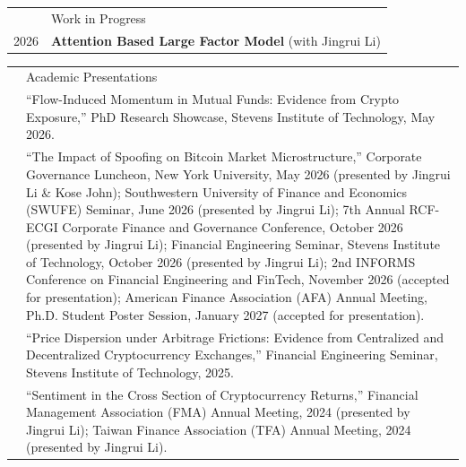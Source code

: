 \documentclass[letterpaper, 11pt]{article}
\newcommand{\headingfont}{\Large\color{OliveGreen}}
\newenvironment{SectionTable}[1]{
	\renewcommand*{\arraystretch}{1.55}
	\setlength{\tabcolsep}{10pt}
	\begin{longtable}{Rp{5.45in}} & #1 \\}
{\end{longtable}\vspace{-.3cm}}
\newenvironment{SectionTableSingleSpace}[1]{
	\renewcommand*{\arraystretch}{1.15}
	\setlength{\tabcolsep}{10pt}
	\begin{longtable}{Rp{5.45in}} & #1 \\[0.6em]}
{\end{longtable}\vspace{-.3cm}}
\begin{document}
\begin{SectionTable}{\headingfont Work in Progress}
2026 &
\textbf{Attention Based Large Factor Model} \newline
(with Jingrui Li)
\end{SectionTable}


\begin{SectionTableSingleSpace}{\headingfont Academic Presentations}
& ``Flow-Induced Momentum in Mutual Funds: Evidence from Crypto Exposure,'' PhD Research Showcase, Stevens Institute of Technology, May 2026. \\

& ``The Impact of Spoofing on Bitcoin Market Microstructure,'' Corporate Governance Luncheon, New York University, May 2026 (presented by Jingrui Li \& Kose John); Southwestern University of Finance and Economics (SWUFE) Seminar, June 2026 (presented by Jingrui Li); 7th Annual RCF-ECGI Corporate Finance and Governance Conference, October 2026 (presented by Jingrui Li); Financial Engineering Seminar, Stevens Institute of Technology, October 2026 (presented by Jingrui Li); 2nd INFORMS Conference on Financial Engineering and FinTech, November 2026 (accepted for presentation); American Finance Association (AFA) Annual Meeting, Ph.D. Student Poster Session, January 2027 (accepted for presentation). \\

& ``Price Dispersion under Arbitrage Frictions: Evidence from Centralized and Decentralized Cryptocurrency Exchanges,'' Financial Engineering Seminar, Stevens Institute of Technology, 2025. \\

& ``Sentiment in the Cross Section of Cryptocurrency Returns,'' Financial Management Association (FMA) Annual Meeting, 2024 (presented by Jingrui Li); Taiwan Finance Association (TFA) Annual Meeting, 2024 (presented by Jingrui Li).
\end{SectionTableSingleSpace}


\end{document}
